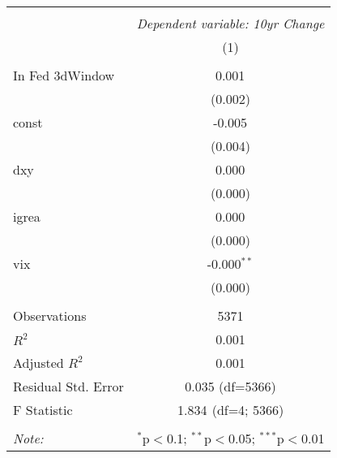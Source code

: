 \begin{table}[!htbp] \centering
\begin{tabular}{@{\extracolsep{5pt}}lc}
\\[-1.8ex]\hline
\hline \\[-1.8ex]
& \multicolumn{1}{c}{\textit{Dependent variable: 10yr Change}} \
\cr \cline{2-2}
\\[-1.8ex] & (1) \\
\hline \\[-1.8ex]
 In Fed 3dWindow & 0.001$^{}$ \\
& (0.002) \\
 const & -0.005$^{}$ \\
& (0.004) \\
 dxy & 0.000$^{}$ \\
& (0.000) \\
 igrea & 0.000$^{}$ \\
& (0.000) \\
 vix & -0.000$^{**}$ \\
& (0.000) \\
\hline \\[-1.8ex]
 Observations & 5371 \\
 $R^2$ & 0.001 \\
 Adjusted $R^2$ & 0.001 \\
 Residual Std. Error & 0.035 (df=5366) \\
 F Statistic & 1.834$^{}$ (df=4; 5366) \\
\hline
\hline \\[-1.8ex]
\textit{Note:} & \multicolumn{1}{r}{$^{*}$p$<$0.1; $^{**}$p$<$0.05; $^{***}$p$<$0.01} \\
\end{tabular}
\end{table}